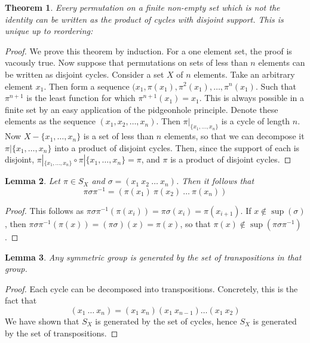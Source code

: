 \documentclass[12pt]{report}
\newtheorem{theorem}{Theorem}[section]
\newtheorem{lemma}[theorem]{Lemma}
\begin{document}
\begin{theorem}
Every permutation on a finite non-empty set which is not the identity can be written as the product of cycles with disjoint support. This is unique up to reordering:
\end{theorem}
\begin{proof}
    We prove this theorem by induction. For a one element set, the proof is vacously true. Now suppose that permutations on sets of less than $n$ elements can be written as disjoint cycles. Consider a set $X$ of $n$ elements. Take an arbitrary element $x_1$. Then form a sequence $(x_1, \pi(x_1), \pi^2(x_1), \dots, \pi^n(x_1)$. Such that $\pi^{n+1}$ is the least function for which $\pi^{n+1}(x_1) = x_1$. This is always possible in a finite set by an easy application of the pidgeonhole principle. Denote these elements as the sequence $(x_1, x_2, \dots, x_n)$. Then $\pi|_{\{ x_1, \dots, x_n\}}$ is a cycle of length $n$. Now $X - \{ x_1, \dots, x_n \}$ is a set of less than $n$ elements, so that we can decompose it $\pi|{\{ x_1, \dots, x_n\}}$ into a product of disjoint cycles. Then, since the support of each is disjoint,
    $\pi|_{\{ x_1, \dots, x_n\}} \circ \pi|{\{ x_1, \dots, x_n\}} = \pi$, and $\pi$ is a product of disjoint cycles.
\end{proof}

\begin{lemma}
    Let $\pi \in S_X$ and $\sigma = (x_1\ x_2\ \dots\ x_n)$. Then it follows that
    \[\pi \sigma \pi^{-1} = (\pi(x_1)\ \pi(x_2)\ \dots\ \pi(x_n))\]
\end{lemma}
\begin{proof}
    This follows as $\pi \sigma \pi^{-1} (\pi(x_i)) = \pi \sigma(x_i) = \pi(x_{i+1})$. If $x \notin \sup(\sigma)$, then $\pi \sigma \pi^{-1} (\pi (x)) = (\pi \sigma) (x) = \pi(x)$, so that $\pi(x) \notin \sup(\pi \sigma \pi^{-1})$.
\end{proof}

\begin{lemma}
    Any symmetric group is generated by the set of transpositions in that group.
\end{lemma}
\begin{proof}
Each cycle can be decomposed into transpositions. Concretely, this is the fact that
%
\[ (x_1\ \dots\ x_n) = (x_1\ x_n) (x_1\ x_{n-1}) \dots (x_1\ x_2) \]
%
We have shown that $S_X$ is generated by the set of cycles, hence $S_X$ is generated by the set of transpositions.
\end{proof}
\end{document}
